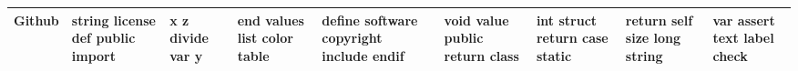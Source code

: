 \documentclass[11pt,a4paper]{article}
\begin{document}
\begin{appendices}
\begin{table}[htb]
\begin{tiny}
\begin{tabular}{|p{}|p{}|p{}|p{}|p{}|p{}|p{}|p{}|p{}|}
    Github & string \newline license \newline def \newline public \newline import & x \newline z \newline divide \newline var \newline y & end \newline values \newline list \newline color \newline table & define \newline software \newline copyright \newline include \newline endif & void \newline value \newline public \newline return \newline class & int \newline struct \newline return \newline case \newline static & return \newline self \newline size \newline long \newline string & var \newline assert \newline text \newline label \newline check\\\hline

\end{tabular}
\end{tiny}
\end{table}
\end{appendices}
\end{document}
